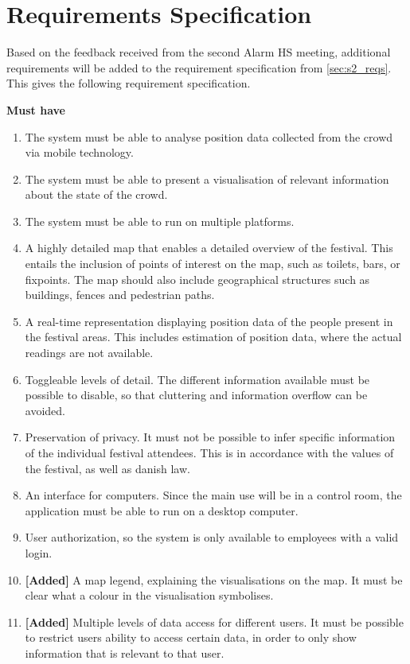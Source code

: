 \section{Requirements Specification} \label{sec:s3_reqs}

Based on the feedback received from the second Alarm HS meeting, additional requirements will be added to the requirement specification from \cref{sec:s2_reqs}. This gives the following requirement specification.

\textbf{Must have}
\begin{enumerate}
    \item The system must be able to analyse position data collected from the crowd via mobile technology.
    \item The system must be able to present a visualisation of relevant information about the state of the crowd.
    \item The system must be able to run on multiple platforms.
    \item A highly detailed map that enables a detailed overview of the festival. This entails the inclusion of points of interest on the map, such as toilets, bars, or fixpoints. The map should also include geographical structures such as buildings, fences and pedestrian paths.
    \item A real-time representation displaying position data of the people present in the festival areas. This includes estimation of position data, where the actual readings are not available.
    \item Toggleable levels of detail. The different information available must be possible to disable, so that cluttering and information overflow can be avoided.
    \item Preservation of privacy. It must not be possible to infer specific information of the individual festival attendees. This is in accordance with the values of the festival, as well as danish law.
    \item An interface for computers. Since the main use will be in a control room, the application must be able to run on a desktop computer.
    \item User authorization, so the system is only available to employees with a valid login.
    \item \textbf{[Added]} A map legend, explaining the visualisations on the map. It must be clear what a colour in the visualisation symbolises.
    \item \textbf{[Added]} Multiple levels of data access for different users. It must be possible to restrict users ability to access certain data, in order to only show information that is relevant to that user.
\end{enumerate}

